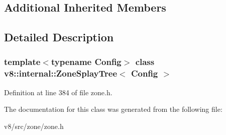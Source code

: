 \subsection*{Additional Inherited Members}


\subsection{Detailed Description}
\subsubsection*{template$<$typename Config$>$\newline
class v8\+::internal\+::\+Zone\+Splay\+Tree$<$ Config $>$}



Definition at line 384 of file zone.\+h.



The documentation for this class was generated from the following file\+:\begin{DoxyCompactItemize}
\item 
v8/src/zone/zone.\+h\end{DoxyCompactItemize}
